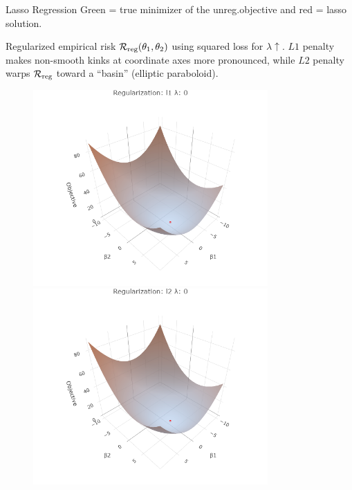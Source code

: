 \documentclass[11pt,compress,t,notes=noshow, xcolor=table]{beamer}
\begin{document}
\begin{vbframe}{Lasso Regression}
Green  = true minimizer of the unreg.objective and red = lasso solution.

\framebreak

Regularized empirical risk $\mathcal{R}_{\text{reg}}(\theta_1,\theta_2)$ using squared loss for $\lambda \uparrow$. $L1$ penalty makes non-smooth kinks at coordinate axes more pronounced, while $L2$ penalty warps $\mathcal{R}_{\text{reg}}$ toward a ``basin'' (elliptic paraboloid). 
 
\begin{figure}
    \begin{minipage}{0.32\linewidth}
        \centerline{\includegraphics[width=0.8\textwidth]{figure/reg_surfaces_l1_lam0.png}}
        \centerline{\includegraphics[width=0.8\textwidth]{figure/reg_surfaces_l2_lam0.png}}
    \end{minipage}
   \begin{minipage}{0.32\linewidth}

\end{minipage}
\end{figure}
\end{vbframe}
\end{document}
